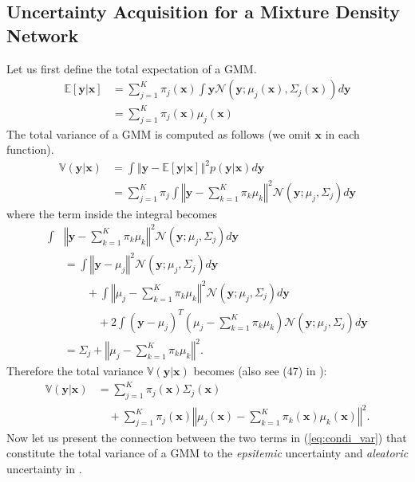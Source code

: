 \documentclass[letterpaper, 10 pt, conference]{ieeeconf}  %
\begin{document}
\subsection{Uncertainty Acquisition for a Mixture Density Network}

Let us first define the total expectation of a GMM. 
\begin{align}
	\mathbb{E}[\mathbf{y}|\mathbf{x}] 
		& = \sum_{j=1}^{K}\pi_{j}(\mathbf{x}) 
			\int\mathbf{y}\mathcal{N}(\mathbf{y};\mu_{j}(\mathbf{x}), 
				\Sigma_{j}(\mathbf{x}))d\mathbf{y} \nonumber \\
		& = \sum_{j=1}^{K}\pi_{j}(\mathbf{x})\mu_{j}(\mathbf{x})
\end{align} \label{eq:condi_exp}
The total variance of a GMM is computed as follows
(we omit $\mathbf{x}$ in each function).
\begin{align*}
	\mathbb{V}(\mathbf{y}|\mathbf{x})  
		& = \int\left\Vert \mathbf{y}-\mathbb{E}\left[\mathbf{y}|\mathbf{x}\right]\right\Vert ^{2}
			p(\mathbf{y}|\mathbf{x})d\mathbf{y}
		\\
		& = \sum_{j=1}^{K}\pi_{j}\int\left\Vert 
			\mathbf{y}-\sum_{k=1}^{K}\pi_{k}\mu_{k}\right\Vert^{2}
			\mathcal{N}(\mathbf{y};\mu_{j},\Sigma_{j})d\mathbf{y}
\end{align*}
where the term inside the integral becomes
\begin{align*}
	\int & \left\Vert \mathbf{y}-\sum_{k=1}^{K}\pi_{k}\mu_{k}\right\Vert^{2}
		\mathcal{N}(\mathbf{y};\mu_{j},\Sigma_{j})d\mathbf{y}
		\\
	& = \int\left\Vert \mathbf{y}-\mu_{j}\right\Vert ^{2}
		\mathcal{N}(\mathbf{y};\mu_{j},\Sigma_{j})d\mathbf{y}
	\\
	& \qquad+\int\left\Vert \mu_{j}-\sum_{k=1}^{K}\pi_{k}\mu_{k}\right\Vert ^{2}
		\mathcal{N}(\mathbf{y};\mu_{j},\Sigma_{j})d\mathbf{y}
	\\
	& \qquad\quad+ 2 \int(\mathbf{y}-\mu_{j})^{T}(\mu_{j}-
		\sum_{k=1}^{K}\pi_{k}\mu_{k})
		\mathcal{N}(\mathbf{y};\mu_{j},\Sigma_{j})d\mathbf{y}
	\\
	& = \Sigma_{j}+\left\Vert \mu_{j}-\sum_{k=1}^{K}\pi_{k}\mu_{k}\right\Vert ^{2}.
\end{align*}
Therefore the total variance $\mathbb{V}(\mathbf{y}|\mathbf{x})$
becomes
(also see (47) in \cite{Bishop_94}):
\begin{align} 
	\mathbb{V}(\mathbf{y}|\mathbf{x})
		&= \sum_{j=1}^{K}\pi_{j}(\mathbf{x})\Sigma_{j}(\mathbf{x}) 
		\nonumber
		\\ 
		&\quad+\sum_{j=1}^{K}\pi_{j}(\mathbf{x}) 
			\left \Vert \mu_{j}(\mathbf{x})-\sum_{k=1}^{K}\pi_{k}(\mathbf{x})
				\mu_{k}(\mathbf{x})\right\Vert ^{2}.
		\label{eq:condi_var}
\end{align}
Now let us present the connection between
the two terms in (\ref{eq:condi_var})
that constitute the total variance of a GMM
to the \textit{epsitemic} uncertainty
and \textit{aleatoric} uncertainty in \cite{Kendall_17}.
\end{document}
